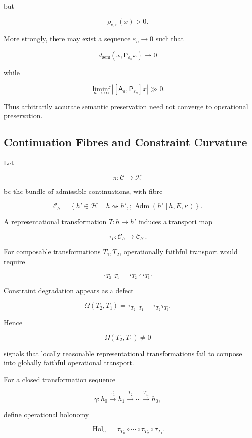 \documentclass[11pt]{article}
\newcommand{\Adm}{\operatorname{Adm}}
\begin{document}
but

\[
\rho_{a,\varepsilon}(x)>0.
\]

More strongly, there may exist a sequence
$\varepsilon_n\rightarrow0$ such that

\[
d_{\mathrm{sem}}
\left(
x,\mathsf P_{\varepsilon_n}x
\right)
\longrightarrow0
\]

while

\[
\liminf_{n\rightarrow\infty}
\left|
[\mathsf A_a,\mathsf P_{\varepsilon_n}]x
\right|
\gg 0.
\]

Thus arbitrarily accurate semantic preservation need not converge to
operational preservation.

\subsection{Continuation Fibres and Constraint Curvature}

Let

\[
\pi:\mathcal C\rightarrow\mathcal H
\]

be the bundle of admissible continuations, with fibre

\[
\mathcal C_h
=
\left\{
h'\in\mathcal H
\,\middle|\,
h\rightsquigarrow h',
;
\Adm(h'\mid h,E,\kappa)
\right\}.
\]

A representational transformation
$T:h\mapsto h'$ induces a transport map

\[
\tau_T:
\mathcal C_h\rightarrow\mathcal C_{h'}.
\]

For composable transformations $T_1,T_2$, operationally faithful transport
would require

\[
\tau_{T_2\circ T_1}
=
\tau_{T_2}\circ\tau_{T_1}.
\]

Constraint degradation appears as a defect

\[
\Omega(T_2,T_1)
=
\tau_{T_2\circ T_1}
-
\tau_{T_2}\tau_{T_1}.
\]

Hence

\[
\boxed{
\Omega(T_2,T_1)\neq0
}
\]

signals that locally reasonable representational transformations fail to
compose into globally faithful operational transport.

For a closed transformation sequence

\[
\gamma:
h_0
\xrightarrow{T_1}
h_1
\xrightarrow{T_2}
\cdots
\xrightarrow{T_n}
h_0,
\]

define operational holonomy

\[
\operatorname{Hol}_{\gamma}
=
\tau_{T_n}\circ\cdots\circ\tau_{T_2}\circ\tau_{T_1}.
\]
\end{document}
